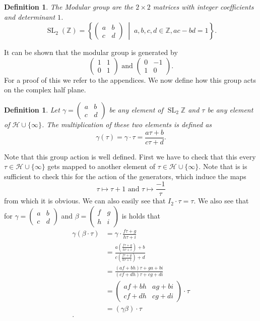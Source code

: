 \documentclass[a4paper]{article}
\theoremstyle{theoremdd}
\theoremstyle{definitiondd}
\newtheorem{definition}[theorem]{Definition}
\theoremstyle{remarkdd}
\newcommand{\Z}{\mathbb{Z}}
\newcommand{\bigset}[2]{ \left\{ #1 \;\middle|\; #2 \right\} }
\DeclareMathOperator{\SL}{SL}
\begin{document}
\begin{definition}
	The \emph{Modular group} are the $2\times 2$ matrices with integer coefficients and determinant $1$.
	 \[
		 \SL_2(\Z) =   \bigset{\begin{pmatrix} a& b\\ c& d \end{pmatrix}}{a, b, c, d \in \Z, ac - bd = 1}
	.\] 
\end{definition}
It can be shown that the modular group is generated by \[
	\begin{pmatrix}  1 & 1 \\ 0 & 1 \end{pmatrix} 
	\text{ and }
	\begin{pmatrix} 0 & -1 \\ 1 & 0 \end{pmatrix} 
.\] 
For a proof of this we refer to the appendices. 
We now define how this group acts on the complex half plane. 
\begin{definition}
	Let  $\gamma = \begin{pmatrix} a & b \\ c & d \end{pmatrix} $ be any element of $\SL_2\Z$ and $\tau$ be any element of $\mathcal{H} \cup \{\infty\} $.
	The multiplication of these two elements is defined as 
	\[
		\gamma(\tau) = \gamma \cdot \tau = \frac{a \tau + b}{ c \tau + d}
	.\] 
\end{definition}
Note that this group action is well defined. First we have to check that this every $\tau \in \mathcal{H} \cup \{\infty\}  $ gets mapped to another element of $\tau \in \mathcal{H} \cup \{ \infty\}$. 
Note that is is sufficient to check this for the action of the generators, which induce the maps \[
\tau \mapsto  \tau+1 \text{ and } \tau \mapsto \frac{-1}{\tau}
\]
from which it is obvious.
We can also easily see that $I_2 \cdot \tau = \tau$. 
We also see that for $\gamma = \begin{pmatrix} a & b \\ c & d \end{pmatrix} $ and $\beta = \begin{pmatrix} f & g \\ h & i \end{pmatrix} $ is holds that 
\begin{align*}
	\gamma \left( \beta \cdot  \tau\right) &=  \gamma\cdot \frac{f\tau + g}{h \tau + i} \\
					       &= \frac{a\left( \frac{f \tau + g}{h\tau + i} \right) + b}{c \left( \frac{f \tau + g}{h \tau + i} \right) + d} \\	
					       &= \frac{(af + bh)\tau + ga + bi}{(cf + dh) \tau + cg + di} \\
					       &= \begin{pmatrix} af + bh & ag + bi \\ cf + dh & cg + di \end{pmatrix} \cdot \tau \\
					       &= (\gamma \beta)\cdot \tau \\
.\end{align*}
\end{document}
